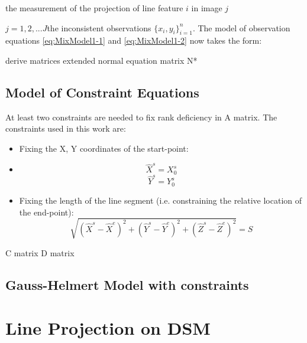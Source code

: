 the measurement of the projection of line feature $i$ in image $j$

$j=1,2,...J$the inconsistent observations $\{x_i,y_i\}^n_{i=1}$. The model of observation equations \eqref{eq:MixModel1-1} and \eqref{eq:MixModel1-2} now takes the form: 

derive matrices
extended normal equation matrix N*



\subsection{Model of Constraint Equations}
\label{subsec:ConEqua}
At least two constraints are needed to fix rank deficiency in A matrix. The constraints used in this work are:
\begin{itemize}
\item Fixing the X, Y coordinates of the start-point:
\item [] \begin{equation} \label{eq:constraint1}
\hat{X}^s=X^s_0
\end{equation}
\begin{equation} \label{eq:constraint2}
\hat{Y}^s=Y^s_0
\end{equation}
\item Fixing the length of the line segment (i.e. constraining the relative location of the end-point):
\begin{equation} \label{eq:constraint3}
\sqrt{(\hat{X}^s-\hat{X}^e)^2+(\hat{Y}^s-\hat{Y}^e)^2+(\hat{Z}^s-\hat{Z}^e)^2}=S
\end{equation}
\end{itemize}


C matrix
D matrix

\subsection{Gauss-Helmert Model with constraints}
\label{subsec:LSadj}



\clearpage
\section{Line Projection on DSM}
\label{sec:LineProjectionOnDSM}

